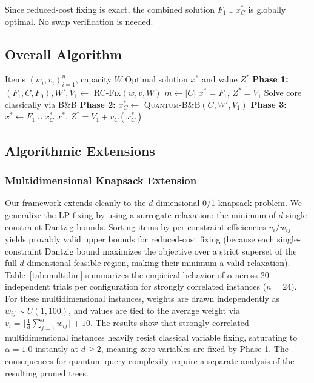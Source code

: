 \documentclass[conference]{IEEEtran}
\begin{document}
Since reduced-cost fixing is exact, the combined solution $F_1 \cup x^*_C$ is globally optimal. No swap verification is needed.

\subsection{Overall Algorithm}

\begin{algorithm}[h]
\caption{LP-Pruned Quantum B\&B Knapsack Solver}
\label{alg:hybrid}
\begin{algorithmic}[1]
\REQUIRE Items $(w_i, v_i)_{i=1}^n$, capacity $W$
\ENSURE Optimal solution $x^*$ and value $Z^*$
\STATE \textbf{Phase 1:} $(F_1, C, F_0), W', V_1 \leftarrow$ \textsc{RC-Fix}$(w, v, W)$ 
\STATE $m \leftarrow |C|$
    \RETURN $x^* = F_1$, $Z^* = V_1$
    \STATE Solve core classically via B\&B
\ELSE
    \STATE \textbf{Phase 2:} $x^*_C \leftarrow$ \textsc{Quantum-B\&B}$(C, W', V_1)$ 
\ENDIF
\STATE \textbf{Phase 3:} $x^* \leftarrow F_1 \cup x^*_C$
\RETURN $x^*$, $Z^* = V_1 + v_C(x^*_C)$
\end{algorithmic}
\end{algorithm}

\subsection{Algorithmic Extensions}



\subsubsection{Multidimensional Knapsack Extension}
Our framework extends cleanly to the $d$-dimensional 0/1 knapsack problem. We generalize the LP fixing by using a surrogate relaxation: the minimum of $d$ single-constraint Dantzig bounds. Sorting items by per-constraint efficiencies $v_i/w_{ij}$ yields provably valid upper bounds for reduced-cost fixing (because each single-constraint Dantzig bound maximizes the objective over a strict superset of the full $d$-dimensional feasible region, making their minimum a valid relaxation). Table~\ref{tab:multidim} summarizes the empirical behavior of $\alpha$ across 20 independent trials per configuration for strongly correlated instances ($n=24$). For these multidimensional instances, weights are drawn independently as $w_{ij} \sim U(1, 100)$, and values are tied to the average weight via $v_i = \lfloor \frac{1}{d} \sum_{j=1}^d w_{ij} \rfloor + 10$. The results show that strongly correlated multidimensional instances heavily resist classical variable fixing, saturating to $\alpha = 1.0$ instantly at $d \ge 2$, meaning zero variables are fixed by Phase 1. The consequences for quantum query complexity require a separate analysis of the resulting pruned trees.
\end{document}
